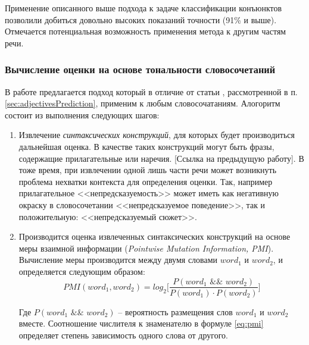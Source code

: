         Применение описанного выше подхода к задаче классификации конъюнктов
        позволили добиться довольно высоких показаний точности (91\% и выше).
        Отмечается потенциальная возможность применения метода к другим
        частям речи.

        \subsubsection{Вычисление оценки на основе тональности словосочетаний}
        В работе \cite{lexiconSO} предлагается подход который в отличие от
        статьи \cite{lexiconAdjectives}, рассмотренной в п. \ref{sec:adjectivesPrediction},
        применим к любым словосочатаниям. Алогоритм состоит из выполнения следующих шагов:
        \begin{enumerate}
            \item Извлечение {\it синтаксических конструкций}, для которых будет производиться
                дальнейшая оценка. В качестве таких конструкций могут быть фразы, содержащие
                прилагательные или наречия. [Ссылка на предыдущую работу]. В тоже время,
                при извлечении одной лишь части речи может возникнуть проблема нехватки контекста
                для определения оценки. Так, например прилагательное <<непредсказуемость>>
                может иметь как негативную окраску в словосочетании <<непредсказуемое поведение>>,
                так и положительную: <<непредсказуемый сюжет>>.
            \item Производится оценка извлеченных синтаксических конструкций на основе
                меры взаимной информации ({\it Pointwise Mutation Information, PMI}).
                Вычисление меры производится между двумя словами $word_1$ и $word_2$,
                и определяется следующим образом:
                \begin{equation}
                    \label{eq:pmi}
                    PMI(word_1, word_2) = log_2 \Bigg[ \dfrac{P(word_1 \hspace{4pt} \&\& \hspace{4pt} word_2)}{P(word_1) \cdot P(word_2)} \Bigg]
                \end{equation}

                Где $P(word_1 \hspace{4pt} \&\& \hspace{4pt} word_2)$ -- вероятность
                размещения слов $word_1$ и $word_2$ вместе. Соотношение числителя
                к знаменателю в формуле \ref{eq:pmi} определяет степень зависимость одного
                слова от другого.


\end{enumerate}
